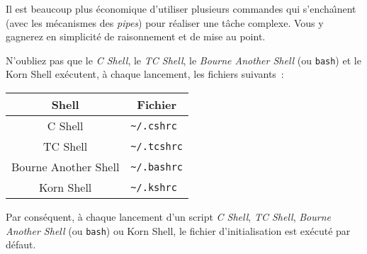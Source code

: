 Il est beaucoup plus {\'e}conomique d'utiliser plusieurs commandes qui s'encha{\^\i}nent (avec les
m{\'e}canismes des {\sl pipes}) pour r{\'e}aliser une t{\^a}che complexe. Vous y gagnerez en simplicit{\'e} de
raisonnement et de mise au point.

N'oubliez pas que le {\sl C Shell}, le {\sl TC Shell}, le {\sl Bourne Another
Shell} (ou {\tt bash}) et le Korn Shell ex{\'e}cutent, {\`a} chaque lancement, les
fichiers suivants~:

\begin{tabular}{|c|l|}
	\hline
	Shell						&	\multicolumn{1}{|c|}{Fichier}	\\
	\hline \hline
	C Shell						&	\verb=~/.cshrc=					\\
	TC Shell					&	\verb=~/.tcshrc=				\\
	Bourne Another Shell		&	\verb=~/.bashrc=				\\
	Korn Shell					&	\verb=~/.kshrc=					\\
	\hline
\end{tabular}

Par cons{\'e}quent, {\`a} chaque lancement d'un script {\sl C Shell}, {\sl TC Shell}, {\sl Bourne Another
Shell} (ou {\tt bash}) ou Korn Shell, le fichier d'initialisation est
ex{\'e}cut{\'e} par d{\'e}faut.
